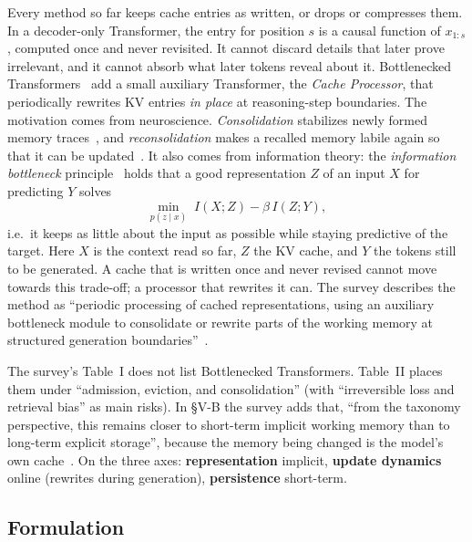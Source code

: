 Every method so far keeps cache entries as written, or drops or compresses them. In a decoder-only
Transformer, the entry for position $s$ is a causal function of $x_{1:s}$, computed once and never
revisited. It cannot discard details that later prove irrelevant, and it cannot absorb what later
tokens reveal about it. Bottlenecked Transformers~\citep{oomerjee2026bottlenecked} add a small
auxiliary Transformer, the \emph{Cache Processor}, that periodically rewrites KV entries \emph{in place}
at reasoning-step boundaries. The motivation comes from neuroscience. \emph{Consolidation} stabilizes
newly formed memory traces~\citep{c13-mcgaugh2000}, and \emph{reconsolidation} makes a recalled
memory labile again so that it can be updated~\citep{c13-nader2000}. It also comes from information
theory: the \emph{information bottleneck} principle~\citep{c13-tishby2000ib} holds that a good
representation $Z$ of an input $X$ for predicting $Y$ solves
\begin{equation}\label{eq:c13-ib}
  \min_{p(z\mid x)}\; I(X;Z)-\beta\,I(Z;Y),
\end{equation}
i.e.\ it keeps as little about the input as possible while staying predictive of the target. Here
$X$ is the context read so far, $Z$ the KV cache, and $Y$ the tokens still to be generated. A cache that is
written once and never revised cannot move towards this trade-off; a processor that rewrites it can. The
survey describes the method as ``periodic processing of cached representations, using an auxiliary
bottleneck module to consolidate or rewrite parts of the working memory at structured generation
boundaries''~\citep{zhoubian2026memory}.

\begin{taxonomy}
The survey's Table~I does not list Bottlenecked Transformers. Table~II places them under
``admission, eviction, and consolidation'' (with ``irreversible loss and retrieval bias'' as main risks).
In \S V-B the survey adds that, ``from the taxonomy perspective, this remains closer to short-term
implicit working memory than to long-term explicit storage'', because the memory being changed is
the model's own cache~\citep{zhoubian2026memory}. On the three axes: \textbf{representation} implicit,
\textbf{update dynamics} online (rewrites during generation), \textbf{persistence} short-term.
\end{taxonomy}

\subsection{Formulation}\label{sec:c13-bt-form}

